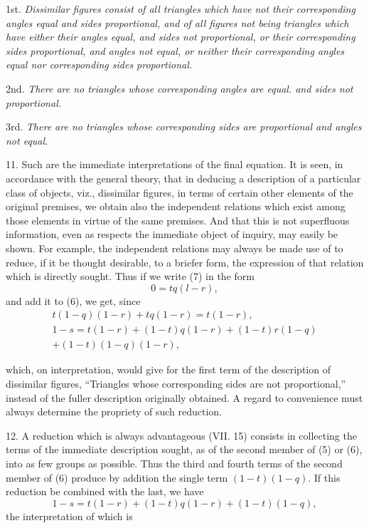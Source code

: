 \documentclass[oneside]{book}
\begin{document}
1st. \textit{Dissimilar figures consist of all triangles which have not their
corresponding angles equal and sides proportional, and of all figures
not being triangles which have either their angles equal, and sides not
proportional, or their corresponding sides proportional, and angles
not equal, or neither their corresponding angles equal nor corresponding
sides proportional.}

2nd. \textit{There are no triangles whose corresponding angles are equal.
and sides not proportional.}

3rd. \textit{There are no triangles whose corresponding sides are proportional and angles not equal.}

11. Such are the immediate interpretations of the final equation.
It is seen, in accordance with the general theory, that in
deducing a description of a particular class of objects, viz., dissimilar figures,
in terms of certain other elements of the original
premises, we obtain also the independent relations which exist
among those elements in virtue of the same premises. And that
this is not superfluous information, even as respects the immediate
object of inquiry, may easily be shown. For example, the
independent relations may always be made use of to reduce, if it
be thought desirable, to a briefer form, the expression of that
relation which is directly sought. Thus if we write (7) in the
form
\[
0=tq(l-r),
\]
and add it to (6), we get, since
\begin{eqnarray*}
t(1-q)(1-r)+tq(1-r)=t(1-r),\\
1-s=t(1-r)+(1-t)q(1-r)+(1-t)r(1-q)\\
+(1-t)(1-q)(1-r),
\end{eqnarray*}

which, on interpretation, would give for the first term of the description
of dissimilar figures, ``Triangles whose corresponding
sides are not proportional,'' instead of the fuller description originally
obtained. A regard to convenience must always determine
the propriety of such reduction.

12. A reduction which is always advantageous (VII. 15) consists
in collecting the terms of the immediate description sought,
as of the second member of (5) or (6), into as few groups as
possible. Thus the third and fourth terms of the second member
of (6) produce by addition the single term $(1 - t)(1 - q)$.
If this reduction be combined with the last, we have
\[
1 - s = t (1 - r) + (1 - t) q (1 - r) + (1 - t) (1 - q),
\]
the interpretation of which is
\end{document}
